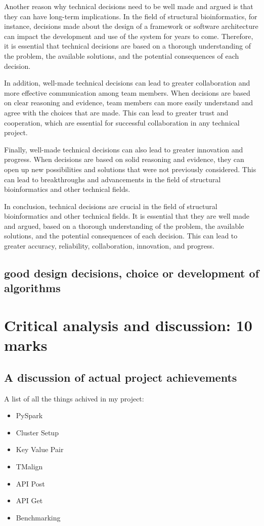 \documentclass[]{final_report}
\begin{document}
Another reason why technical decisions need to be well made and argued is that they can have long-term implications. In the field of structural bioinformatics, for instance, decisions made about the design of a framework or software architecture can impact the development and use of the system for years to come. Therefore, it is essential that technical decisions are based on a thorough understanding of the problem, the available solutions, and the potential consequences of each decision.

In addition, well-made technical decisions can lead to greater collaboration and more effective communication among team members. When decisions are based on clear reasoning and evidence, team members can more easily understand and agree with the choices that are made. This can lead to greater trust and cooperation, which are essential for successful collaboration in any technical project.

Finally, well-made technical decisions can also lead to greater innovation and progress. When decisions are based on solid reasoning and evidence, they can open up new possibilities and solutions that were not previously considered. This can lead to breakthroughs and advancements in the field of structural bioinformatics and other technical fields.

In conclusion, technical decisions are crucial in the field of structural bioinformatics and other technical fields. It is essential that they are well made and argued, based on a thorough understanding of the problem, the available solutions, and the potential consequences of each decision. This can lead to greater accuracy, reliability, collaboration, innovation, and progress.
\subsection{good design decisions, choice or development of algorithms}

\section{Critical analysis and discussion: 10 marks}
\subsection{A discussion of actual project achievements}
A list of all the things achived in my project:

\begin{itemize}
    \item PySpark
    \item Cluster Setup
    \item Key Value Pair
    \item TMalign
    \item API Post
    \item API Get
    \item Benchmarking
\end{itemize}
\end{document}
